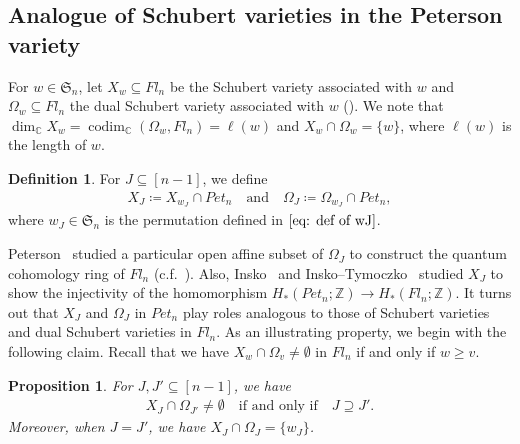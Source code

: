 \documentclass[11pt]{article}
\newtheorem{prop}[theo]{Proposition}
\theoremstyle{definition}
\newtheorem{defi}[theo]{Definition}
\numberwithin{equation}{section}
\numberwithin{equation}{section}
\DeclareMathOperator{\codim}{codim}
\begin{document}
\subsection{Analogue of Schubert varieties in the Peterson variety}
For $w\in \mathfrak{S}_n$, 
let $X_{w}\subseteq Fl_n$ be the Schubert variety associated with $w$ and $\Omega_w\subseteq Fl_n$ the dual Schubert variety associated with $w$ (\cite[Sect.~10]{fult97}).
We note that $\dim_{{\mathbb C}} X_{w} =\codim_{{\mathbb C}} (\Omega_w,Fl_n)= \ell(w)$ and $X_w\cap \Omega_w=\{w\}$, where $\ell(w)$ is the length of $w$.
\begin{defi}
For $J\subseteq [n-1]$, we define
\begin{equation}
\begin{split}\label{eq: subavr 10}
X_{J} 
\coloneqq X_{w_J}\cap Pet_{n} \quad \text{and} \quad \Omega_{J} 
\coloneqq \Omega_{w_J}\cap Pet_{n},
\end{split}
\end{equation}
where $w_J\in\mathfrak{S}_n$ is the permutation defined in $\eqref{eq: def of wJ}$.
\end{defi}

Peterson~\cite{Peterson} studied a particular open affine subset of $\Omega_J$ to construct the quantum cohomology ring of $Fl_n$ (c.f.~\cite{Kostant,Rietsch06}). Also, Insko~\cite{Insko} and Insko--Tymoczko~\cite{Insko-Tymoczko} studied $X_J$ to show the injectivity of the homomorphism $H_*(Pet_{n};{\mathbb Z})\rightarrow H_*(Fl_n;{\mathbb Z})$. It turns out that $X_J$ and $\Omega_J$ in $Pet_{n}$ play roles analogous to those of Schubert varieties and dual Schubert varieties in $Fl_n$. As an illustrating property, we begin with the following claim. Recall that we have $X_{w}\cap \Omega_{v}\ne\emptyset$ in $Fl_n$ if and only if $w\ge v$. 

\begin{prop}\label{prop: point intersection 2}
For $J,J'\subseteq[n-1]$, we have
\begin{align*}
X_{J}\cap \Omega_{J'} \neq \emptyset
\quad \text{if and only if} \quad
J \supseteq J'.
\end{align*}
Moreover, when $J=J'$, we have $X_J \cap \Omega_J = \{w_{J}\}$.
\end{prop}
\end{document}
